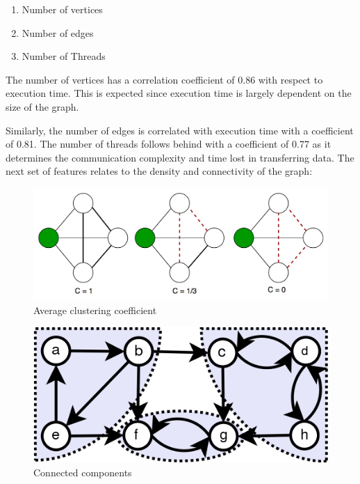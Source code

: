 \begin{enumerate}
  \item Number of vertices
  \item Number of edges
  \item Number of Threads
\end{enumerate}
The number of vertices has a correlation coefficient of 0.86 with respect to execution time. This is expected since execution time is largely dependent on the size of the graph.

Similarly, the number of edges is correlated with execution time with a coefficient of 0.81. The number of threads follows behind with a coefficient of 0.77 as it determines the communication complexity and time lost in transferring data. The next set of features relates to the density and connectivity of the graph: 

\begin{figure}
    \centering
    \includegraphics[width=1\columnwidth]{figures/features_avg_clustering.png}
    \caption{Average clustering coefficient}
    \label{Average clustering coefficient}
\end{figure}

\begin{figure}
    \centering
    \includegraphics[width=.5\columnwidth]{figures/features_scc.png}
    \caption{Connected components}
    \label{Connected components}
\end{figure}


